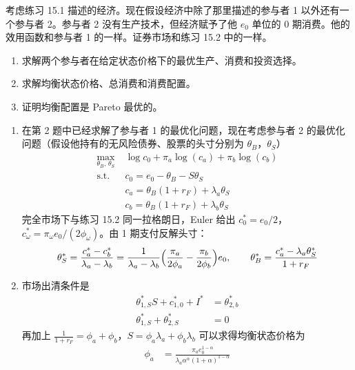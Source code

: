 \begin{problem}
 考虑练习 15.1 描述的经济。现在假设经济中除了那里描述的参与者 1 以外还有一个参与者 2。参与者 2 没有生产技术，但经济赋予了他 $e_{0}$ 单位的 0 期消费。他的效用函数和参与者 1 的一样。证券市场和练习 15.2 中的一样。
\begin{enumerate}[label=(\alph*)]
    \item 求解两个参与者在给定状态价格下的最优生产、消费和投资选择。
    \item 求解均衡状态价格、总消费和消费配置。
    \item 证明均衡配置是 Pareto 最优的。
\end{enumerate}
\end{problem}
\begin{solution}
\begin{enumerate}[label=(\alph*)]
    \item 在第 2 题中已经求解了参与者 1 的最优化问题，现在考虑参与者 2 的最优化问题（假设他持有的无风险债券、股票的头寸分别为 $\theta_{B}$，$\theta_{S}$）
    \[
        \begin{aligned}
            \max_{\theta_{B},\,\theta_{S}}\;&\log c_{0}+\pi_{a}\log(c_{a})+\pi_{b}\log(c_{b})\\
            \text{s.t.}\;&c_{0}=e_{0}-\theta_{B}-S\theta_{S}\\
            &c_{a}=\theta_{B}(1+r_{F})+\lambda_{a}\theta_{S}\\
            &c_{b}=\theta_{B}(1+r_{F})+\lambda_{b}\theta_{S}
        \end{aligned}
    \]
    完全市场下与练习 15.2 同一拉格朗日，Euler 给出 $c_{0}^{*}=e_{0}/2$，$c_{\omega}^{*}=\pi_{\omega}e_{0}/(2\phi_{\omega})$。由 1 期支付反解头寸：
    \[
        \theta_{S}^{*}=\frac{c_{a}^{*}-c_{b}^{*}}{\lambda_{a}-\lambda_{b}}=\frac{1}{\lambda_{a}-\lambda_{b}}\Bigl(\frac{\pi_{a}}{2\phi_{a}}-\frac{\pi_{b}}{2\phi_{b}}\Bigr)e_{0},\qquad
        \theta_{B}^{*}=\frac{c_{a}^{*}-\lambda_{a}\theta_{S}^{*}}{1+r_{F}}
    \]
    \item 市场出清条件是
    \[
        \begin{aligned}
            \theta_{1,S}^{*}S+c_{1,0}^{*}+I^{*}&=\theta_{2,b}^{*}\\
            \theta_{1,S}^{*}+\theta_{2,S}^{*}&=0
        \end{aligned}
    \]
    再加上 $\frac{1}{1+r_{F}}=\phi_{a}+\phi_{b}$，$S=\phi_{a}\lambda_{a}+\phi_{b}\lambda_{b}$ 可以求得均衡状态价格为
    \[
        \begin{aligned}
            \phi_{a}&=\frac{\pi_{a}e_{0}^{1-\alpha}}{\lambda_{a}\alpha^{\alpha}(1+\alpha)^{1-\alpha}}\\

\end{aligned}\]
\end{enumerate}
\end{solution}
